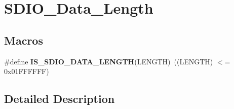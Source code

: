 \hypertarget{group___s_d_i_o___data___length}{}\section{S\+D\+I\+O\+\_\+\+Data\+\_\+\+Length}
\label{group___s_d_i_o___data___length}
\subsection*{Macros}
\begin{DoxyCompactItemize}
\item 
\hypertarget{group___s_d_i_o___data___length_ga57dd64db3f69d18625ea8ca82c009fad}{}\#define {\bfseries I\+S\+\_\+\+S\+D\+I\+O\+\_\+\+D\+A\+T\+A\+\_\+\+L\+E\+N\+G\+T\+H}(L\+E\+N\+G\+T\+H)~((L\+E\+N\+G\+T\+H) $<$= 0x01\+F\+F\+F\+F\+F\+F)\label{group___s_d_i_o___data___length_ga57dd64db3f69d18625ea8ca82c009fad}

\end{DoxyCompactItemize}


\subsection{Detailed Description}
